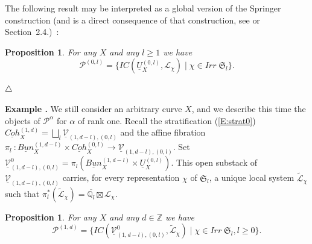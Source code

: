 \documentclass[a4paper,10pt]{amsart}
\def\endexample{$\hfill \triangle$}
\def\Z{\mathbb{Z}}
\def\endexample{$\hfill \triangle$}
\def\a{\alpha}
\def\qlb{\overline{\mathbb{Q}_l}}
\newtheorem{prop}[theo]{Proposition}
\numberwithin{equation}{section}
\begin{document}
\vspace{.1in}

The following result may be interpreted as a global version of the Springer construction (and is a direct consequence of that construction, see \cite{Laumon} or Section~2.4.)~:

\begin{prop}\label{P:zzx} For any $X$ and any $l \geq 1$ we have
$$\mathcal{P}^{(0,l)}=\big\{ IC(\underline{U}_X^{(0,l)},\mathcal{L}_{\chi})\;|\; \chi \in Irr\;\mathfrak{S}_l\big\}.$$
\end{prop}
\endexample

\vspace{.2in}

\addtocounter{theo}{1}
\noindent \textbf{Example \thetheo .} We still consider an arbitrary curve $X$, and we describe this time the objects of $\mathcal{P}^{\a}$ for $\a$ of rank one. Recall the stratification (\ref{E:strat0})
$\underline{Coh}^{(1,d)}_X=\bigsqcup_{l} \underline{\mathcal{V}}_{(1,d-l),(0,l)}$ and the affine fibration $\pi_l~:\underline{Bun}_X^{(1,d-l)} \times \underline{Coh}^{(0,l)}_X \to \underline{\mathcal{V}}_{(1,d-l),(0,l)}$. Set $\underline{\mathcal{V}}^0_{(1,d-l),(0,l)}=\pi_l (\underline{Bun}_X^{(1,d-l)} \times \underline{U}^{(0,l)}_X)$. This open substack of $\underline{\mathcal{V}}_{(1,d-l),(0,l)}$ carries, for every representation $\chi$ of $\mathfrak{S}_l$, a unique local system $\widetilde{\mathcal{L}}_{\chi}$ such that $\pi_l^*(\widetilde{\mathcal{L}}_{\chi})=\qlb \boxtimes \mathcal{L}_{\chi}$.

\vspace{.1in}

\begin{prop}\label{P:xzs} For any $X$ and any $d \in \Z$ we have
$$\mathcal{P}^{(1,d)}=\big\{ IC(\underline{\mathcal{V}}^0_{(1,d-l),(0,l)},\widetilde{\mathcal{L}}_{\chi})\;|\; \chi \in Irr\;\mathfrak{S}_l, l \geq 0 \big\}.$$
\end{prop}
\end{document}
